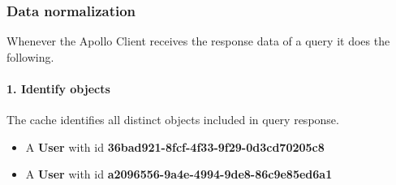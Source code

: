 

\subsubsection{Data normalization}

Whenever the Apollo Client receives the response data of a query it does the following.

\paragraph{1. Identify objects}

The cache identifies all distinct objects included in query response.

\begin{itemize}
    \item A \textbf{User} with id \textbf{36bad921-8fcf-4f33-9f29-0d3cd70205c8}
    \item A \textbf{User} with id \textbf{a2096556-9a4e-4994-9de8-86c9e85ed6a1}
\end{itemize}

